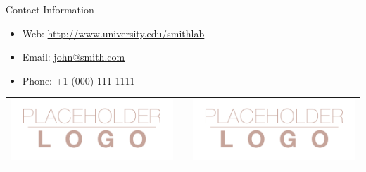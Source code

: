 \documentclass[final]{beamer}
\newlength{\onecolwid}
\begin{document}
\begin{frame}[t]
\begin{columns}[t]
\begin{column}{\onecolwid}
\begin{alertblock}{Contact Information}

\begin{itemize}
\item Web: \href{http://www.university.edu/smithlab}{http://www.university.edu/smithlab}
\item Email: \href{mailto:john@smith.com}{john@smith.com}
\item Phone: +1 (000) 111 1111
\end{itemize}

\end{alertblock}

\begin{center}
\begin{tabular}{ccc}
\includegraphics[width=0.4\linewidth]{logo.png} & \hfill & \includegraphics[width=0.4\linewidth]{logo.png}
\end{tabular}
\end{center}


\end{column} %

\end{columns} %

\end{frame} %
\end{document}
